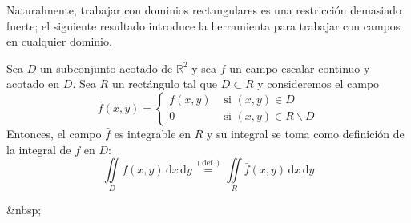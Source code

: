 Naturalmente, trabajar con dominios rectangulares es una restricción demasiado fuerte;
el siguiente resultado introduce la herramienta para trabajar con campos en cualquier dominio.
%
\begin{teorema}\label{th:barf}
Sea $D$ un subconjunto acotado de $\mathbb{R}^2$ y sea $f$ un campo escalar continuo y acotado en $D$. Sea $R$ un rectángulo tal que $D\subset R$ y consideremos el campo
\[
\bar{f}(x,y)=\begin{cases}
f(x,y) & \text{ si } (x,y)\in D\\
0 & \text{ si } (x,y)\in R\smallsetminus D
\end{cases}
\]
Entonces, el campo $\bar f$ es integrable en $R$ y su integral se toma como definición de la integral de $f$ en $D$:
\[
\iint\limits_D f(x,y)\,\mathrm dx\,\mathrm dy \stackrel{(\mathrm{def.})}{=} \iint\limits_R \bar{f}(x,y)\,\mathrm dx\,\mathrm dy
\]
\end{teorema}
\begin{rawhtml}
&nbsp;
\end{rawhtml}
